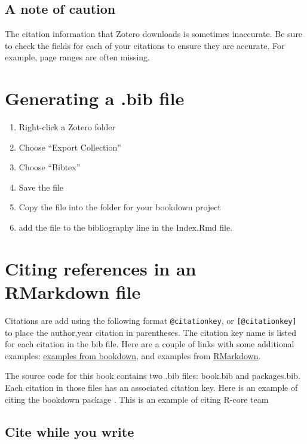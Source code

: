 \documentclass[]{book}
\providecommand{\tightlist}{%
  \setlength{\itemsep}{0pt}\setlength{\parskip}{0pt}}
\theoremstyle{definition}
\theoremstyle{definition}
\theoremstyle{definition}
\theoremstyle{remark}
\begin{document}
\subsection{A note of caution}\label{a-note-of-caution}

The citation information that Zotero downloads is sometimes inaccurate.
Be sure to check the fields for each of your citations to ensure they
are accurate. For example, page ranges are often missing.

\section{Generating a .bib file}\label{generating-a-.bib-file}

\begin{enumerate}
\def\labelenumi{\arabic{enumi}.}
\tightlist
\item
  Right-click a Zotero folder
\item
  Choose ``Export Collection''
\item
  Choose ``Bibtex''
\item
  Save the file
\item
  Copy the file into the folder for your bookdown project
\item
  add the file to the bibliography line in the Index.Rmd file.
\end{enumerate}

\section{Citing references in an RMarkdown
file}\label{citing-references-in-an-rmarkdown-file}

Citations are add using the following format \texttt{@citationkey}, or
\texttt{{[}@citationkey{]}} to place the author,year citation in
parentheses. The citation key name is listed for each citation in the
bib file. Here are a couple of links with some additional examples:
\href{https://bookdown.org/yihui/bookdown/citations.html}{examples from
bookdown}, and examples from
\href{http://rmarkdown.rstudio.com/authoring_bibliographies_and_citations.html}{RMarkdown}.

The source code for this book contains two .bib files: book.bib and
packages.bib. Each citation in those files has an associated citation
key. Here is an example of citing the bookdown package \citep{xie2015}.
This is an example of citing R-core team \citep{R-base}

\subsection{Cite while you write}\label{cite-while-you-write}
\end{document}
